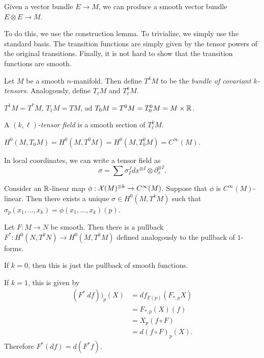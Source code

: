 \documentclass[twoside, 10pt]{article}
\begin{document}
    \begin{exm}
        Given a vector bundle $E \to M$, we can produce a smooth vector bundle $E \otimes E \to M$.
    \end{exm}

    To do this, we use the construction lemma. To trivialize, we simply use the standard basis. The transition functions are simply given by the tensor powers of the original transitions. Finally, it is not hard to show that the transition functions are smooth.

    \begin{defn}
        Let $M$ be a smooth $n$-manifold. Then define $T^kM$ to be the \textit{bundle of covariant $k$-tensors}. Analogously, define $T_{\ell} M$ and $T_{\ell}^kM$.
    \end{defn}

    \begin{rmk}
        $T^1M = T^*M$, $T_1M = TM$, ad $T_0M = T^0M = T_0^0M = M \times \mathbb{R}$.
    \end{rmk}

    \begin{defn}
        A \textit{$(k,\ell)$-tensor field} is a smooth section of $T_{\ell}^k M$.
    \end{defn}

    \begin{exm}
        $H^0(M, T_0M) = H^0(M, T^0M) = H^0(M, T_0^0M) = C^{\infty}(M)$.
    \end{exm}

    In local coordinates, we can write a tensor field as
    \[ \sigma = \sum \sigma^{J}_I dx^{\otimes I} \otimes \partial_x^{\otimes I}.\]

    \begin{prop}
        Consider an $\mathbb{R}$-linear map $\phi: \mathcal{X}(M)^{\otimes k} \to C^{\infty}(M)$. Suppose that $\phi$ is $C^{\infty}(M)$-linear. Then there exists a unique $\sigma \in H^0(M, T^kM)$ such that $\sigma_p(x_1, \ldots, x_k) = \phi(x_1, \ldots, x_k)(p)$.
    \end{prop}

    \begin{defn}
        Let $F:M \to N$ be smooth. Then there is a pullback $F^*: H^0(N, T^kN) \to H^0(M, T^kM)$ defined analogously to the pullback of $1$-forms.
    \end{defn}

    \begin{rmk}
        If $k = 0$, then this is just the pullback of smooth functions.

        If $k = 1$, this is given by 
        \begin{align*}
            (F^*\ df))_p(X) &= df_{F(p)}(F_{*,p}X) \\
                            &= F_{*,p}(X)(f) \\
                            &= X_p(f \circ F) \\
                            &= d(f \circ F)_p(X).
        \end{align*}
        Therefore $F^*(df) = d(F^*f)$.
    \end{rmk}
\end{document}
